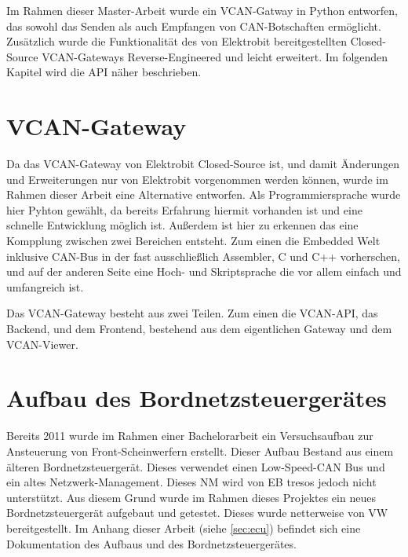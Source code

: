 \documentclass[
  a4paper,					    %
  twoside,
  DIV=calc,     				%
  bibliography=totoc,
  cleardoublepage=empty,
  ngerman,     					%
  final       					%
]{scrbook}
\begin{document}
Im Rahmen dieser Master-Arbeit wurde ein VCAN-Gatway in Python entworfen, das sowohl das Senden als auch Empfangen von CAN-Botschaften ermöglicht. Zusätzlich wurde die Funktionalität des von Elektrobit bereitgestellten Closed-Source VCAN-Gateways Reverse-Engineered und leicht erweitert. Im folgenden Kapitel wird die API näher beschrieben.



\section{VCAN-Gateway}
\label{sec:VCAN_Gateway}
Da das VCAN-Gateway von Elektrobit Closed-Source ist, und damit Änderungen und Erweiterungen nur von Elektrobit vorgenommen werden können, wurde im Rahmen dieser Arbeit eine Alternative entworfen. Als Programmiersprache wurde hier Pyhton gewählt, da bereits Erfahrung hiermit vorhanden ist und eine schnelle Entwicklung möglich ist. Außerdem ist hier zu erkennen das eine Kompplung zwischen zwei Bereichen entsteht. Zum einen die Embedded Welt inklusive CAN-Bus in der fast ausschließlich Assembler, C und C++ vorherschen, und auf der anderen Seite eine Hoch- und Skriptsprache die vor allem einfach und umfangreich ist.

Das VCAN-Gateway besteht aus zwei Teilen. Zum einen die VCAN-API, das Backend, und dem Frontend, bestehend aus dem eigentlichen Gateway und dem VCAN-Viewer.




\section{Aufbau des Bordnetzsteuergerätes}
\label{sec:Aufbau_der_ECU}
Bereits 2011 wurde im Rahmen einer Bachelorarbeit ein Versuchsaufbau zur Ansteuerung von Front-Scheinwerfern erstellt. Dieser Aufbau Bestand aus einem älteren Bordnetzsteuergerät. Dieses verwendet einen Low-Speed-CAN Bus und ein altes Netzwerk-Management. Dieses NM wird von EB tresos jedoch nicht unterstützt. Aus diesem Grund wurde im Rahmen dieses Projektes ein neues Bordnetzsteuergerät aufgebaut und getestet. Dieses wurde netterweise von VW bereitgestellt. Im Anhang dieser Arbeit (siehe \ref{sec:ecu}) befindet sich eine Dokumentation des Aufbaus und des Bordnetzsteuergerätes.
\end{document}
